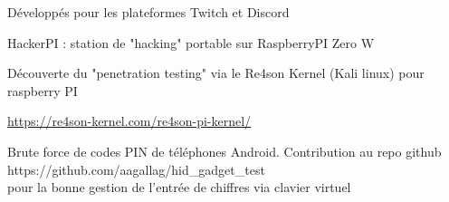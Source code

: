 \begin{cventries}
{\begin{cvitems}
        \item {Développés pour les plateformes Twitch et Discord\\}
      \end{cvitems}
    }
  \cventry
    {} %
    {HackerPI : station de "hacking" portable sur RaspberryPI Zero W} %
    {} %
    {} %
    {
      \begin{cvitems} %
        \item {Découverte du "penetration testing" via le Re4son Kernel (Kali linux) pour raspberry PI}
        \item {\href{https://re4son-kernel.com/re4son-pi-kernel/}{https://re4son-kernel.com/re4son-pi-kernel/}}
        \item Brute force de codes PIN de téléphones Android. Contribution au repo github https://github.com/aagallag/hid\_gadget\_test\\pour la bonne gestion de l'entrée de chiffres via clavier virtuel\
      \end{cvitems}
    }
\end{cventries}